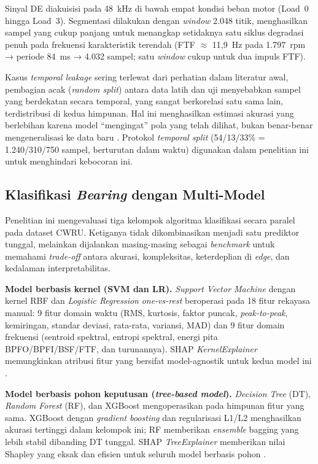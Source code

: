 Sinyal DE diakuisisi pada 48~kHz di bawah empat kondisi beban motor (Load~0
hingga Load~3). Segmentasi dilakukan dengan \emph{window} 2.048 titik, menghasilkan
sampel yang cukup panjang untuk menangkap setidaknya satu siklus degradasi penuh
pada frekuensi karakteristik terendah (FTF $\approx$ 11,9~Hz pada 1.797~rpm →
periode 84~ms → 4.032 sampel; satu \emph{window} cukup untuk dua impuls FTF).

Kasus \emph{temporal leakage} sering terlewat dari perhatian dalam literatur awal,
pembagian acak (\emph{random split}) antara data latih dan uji menyebabkan
sampel yang berdekatan secara temporal, yang sangat berkorelasi satu sama lain,
terdistribusi di kedua himpunan. Hal ini menghasilkan estimasi akurasi yang
berlebihan karena model ``mengingat'' pola yang telah dilihat, bukan benar-benar
mengeneralisasi ke data baru . Protokol
\emph{temporal split} (54/13/33\% = 1.240/310/750 sampel, berturutan dalam
waktu) digunakan dalam penelitian ini untuk menghindari kebocoran ini.

\subsection{Klasifikasi \emph{Bearing} dengan Multi-Model}
\label{subsec:bab2_multi_model}

Penelitian ini mengevaluasi tiga kelompok algoritma klasifikasi secara paralel
pada dataset CWRU. Ketiganya tidak dikombinasikan menjadi satu prediktor tunggal,
melainkan dijalankan masing-masing sebagai \emph{benchmark} untuk memahami
\emph{trade-off} antara akurasi, kompleksitas, keterdeplian di \emph{edge},
dan kedalaman interpretabilitas.

\textbf{Model berbasis kernel (SVM dan LR).} \emph{Support Vector Machine} dengan
kernel RBF dan \emph{Logistic Regression} \emph{one-vs-rest} beroperasi pada
18 fitur rekayasa manual: 9 fitur domain waktu (RMS, kurtosis, faktor puncak,
\emph{peak-to-peak}, kemiringan, standar deviasi, rata-rata, variansi, MAD) dan
9 fitur domain frekuensi (sentroid spektral, entropi spektral, energi pita
BPFO/BPFI/BSF/FTF, dan turunannya). SHAP \emph{KernelExplainer} memungkinkan
atribusi fitur yang bersifat model-agnostik untuk kedua model ini
.

\textbf{Model berbasis pohon keputusan (\emph{tree-based model}).} \emph{Decision Tree} (DT),
\emph{Random Forest} (RF), dan XGBoost mengoperasikan pada himpunan fitur yang
sama. XGBoost dengan \emph{gradient boosting} dan regularisasi L1/L2
menghasilkan akurasi tertinggi dalam kelompok ini; RF memberikan \emph{ensemble}
bagging yang lebih stabil dibanding DT tunggal. SHAP \emph{TreeExplainer}
memberikan nilai Shapley yang eksak dan efisien untuk seluruh model berbasis pohon
.

